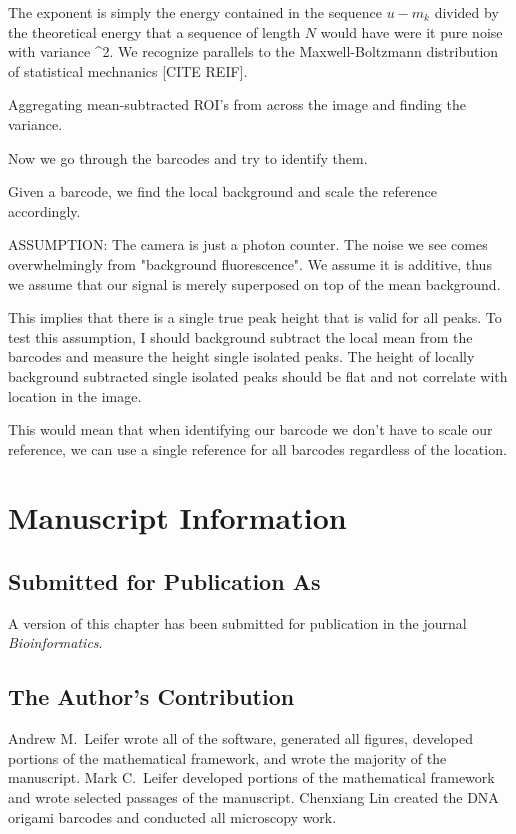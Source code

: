 The exponent is simply the energy contained in the sequence $u-m_k$ divided by the
theoretical energy that a sequence of length $N$ would have were it pure noise with variance \sigma^2. We recognize parallels to the Maxwell-Boltzmann distribution of statistical
mechnanics [CITE REIF].  













Aggregating mean-subtracted ROI's from across the image and finding the variance.

Now we go through the barcodes and try to identify them.

Given a barcode, we find the local background and scale the reference accordingly. 

ASSUMPTION: The camera is just a photon counter. The noise we see comes overwhelmingly from "background fluorescence". We assume it is additive, thus we assume that our signal is merely superposed on top of the mean background. 

This implies that there is a single true peak height that is valid for all peaks. To test this assumption, I should background subtract the local mean from the barcodes and measure the height single isolated peaks. The height of locally background subtracted single isolated peaks should be flat and not correlate with location in the image.

This would mean that when identifying our barcode we don't have to scale our reference, we can use a single reference for all barcodes regardless of the location.


\section{Manuscript Information}
\subsection{Submitted for Publication As}
A version of this chapter has been submitted for publication in the journal \textit{Bioinformatics}.

\subsection{The Author's Contribution}
Andrew M.~Leifer wrote all of the software, generated all figures, developed portions of the mathematical framework, and wrote the majority of the manuscript. Mark C.~Leifer developed portions of the mathematical framework and wrote selected passages of the manuscript. Chenxiang Lin created the DNA origami barcodes and conducted all microscopy work. 
 